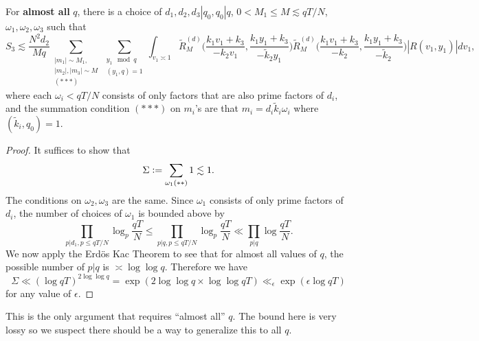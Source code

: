\begin{corollary}\label{almostallek}
    For \textbf{almost all} $q$, there is a choice of $d_1,d_2,d_3|q_0, q_0|q$, $0<M_1\leq M\lesssim qT/N$, $\omega_1,\omega_2,\omega_3$ such that  \[
        S_3\lesssim \frac{N^2d_2}{Mq} 
        \sum_{\substack{|m_1|\sim M_1,\\|m_2|,|m_3|\sim M\\
        (***)}}\sum_{\substack{y_1\mod q\\ (y_1,q)=1} }\int_{v_1\asymp 1}
        \tilde{R}_M^{(d)}\Big(\frac{k_1v_1+k_3}{-k_2v_1},\frac{k_1y_1+k_3}{-\tilde{k}_2y_1}\Big)\tilde{R}_M^{(d)}\Big(\frac{k_1v_1+k_3}{-k_2},\frac{k_1y_1+k_3}{-\tilde{k}_2}\Big)|R\left(v_1,y_1\right)| dv_1,
    \]
    where each $\omega_i<qT/N$ consists of only factors that are also prime factors of $d_i$, and the summation condition $(***)$ on $m_i$'s are that
    $m_i=d_i\tilde{k}_i\omega_i$ where $(\tilde{k}_i,q_0)=1$. 
\end{corollary}
\begin{proof}
    It suffices to show that \[
   \Sigma\mathrel{\mathop:}= \sum_{\omega_1 (**)} 1 \lesssim 1.
    \]
    The conditions on $\omega_2,\omega_3$ are the same. Since $\omega_1$ consists of only prime factors of $d_i$, the number of choices of $\omega_1$ is bounded above by\[
    \prod_{p|d_1, p\leq qT/N}\log_{p} \frac{qT}{N}\leq \prod_{p|q,p\leq qT/N}\log_{p} \frac{qT}{N} \ll \prod_{p|q} \log \frac{qT}{N}.
    \]
    We now apply the Erd\"os Kac Theorem to see that for almost all values of $q$, the possible number of $p|q$ is $\asymp \log \log q$.
    Therefore we have \[
    \Sigma \ll (\log qT)^{2\log \log q} = \exp(2\log \log q \times \log \log qT) \ll_{\epsilon} \exp(\epsilon \log qT)
    \]
    for any value of $\epsilon$.
\end{proof}
\begin{remark}
    This is the only argument that requires ``almost all'' $q$. The bound here is very lossy so we suspect there should be a way to generalize this to all $q$.
\end{remark}
